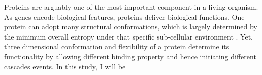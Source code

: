 Proteins are arguably one of the most important component in a living organism. As genes encode biological features, proteins deliver biological functions. One protein can adopt many structural conformations, which is largely determined by the minimum overall entropy under that specific sub-cellular environment . Yet, three dimensional conformation and flexibility of a protein determine its functionality by allowing different binding property and hence initiating different cascades events. In this study, I will be 
